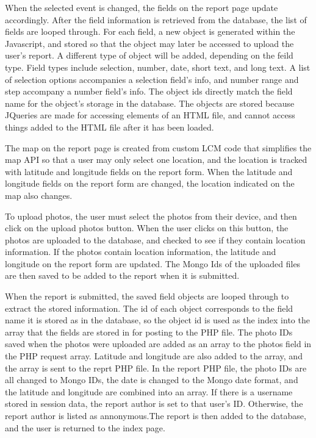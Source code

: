 When the selected event is changed, the fields on the report page update accordingly. After the field information is retrieved from the database, the list of fields are looped through. For each field, a new object is generated within the Javascript, and stored so that the object may later be accessed to upload the user's report. A different type of object will be added, depending on the feild type. Field types include selection, number, date, short text, and long text. A list of selection options accompanies a selection field's info, and number range and step accompany a number field's info. The object ids directly match the field name for the object's storage in the database. The objects are stored because JQueries are made for accessing elements of an HTML file, and cannot access things added to the HTML file after it has been loaded. 

The map on the report page is created from custom LCM code that simplifies the map API so that a user may only select one location, and the location is tracked with latitude and longitude fields on the report form. When the latitude and longitude fields on the report form are changed, the location indicated on the map also changes. 

To upload photos, the user must select the photos from their device, and then click on the upload photos button. When the user clicks on this button, the photos are uploaded to the database, and checked to see if they contain location information. If the photos contain location information, the latitude and longitude on the report form are updated. The Mongo Ids of the uploaded files are then saved to be added to the report when it is submitted.

When the report is submitted, the saved field objects are looped through to extract the stored information. The id of each object corresponds to the field name it is stored as in the database, so the object id is used as the index into the array that the fields are stored in for posting to the PHP file. The photo IDs saved when the photos were uploaded are added as an array to the photos field in the PHP request array. Latitude and longitude are also added to the array, and the array is sent to the reprt PHP file. In the report PHP file, the photo IDs are all changed to Mongo IDs, the date is changed to the Mongo date format, and the latitude and longitude are combined into an array. If there is a username stored in session data, the report author is set to that user's ID. Otherwise, the report author is listed as annonymous.The report is then added to the database, and the user is returned to the index page. 

